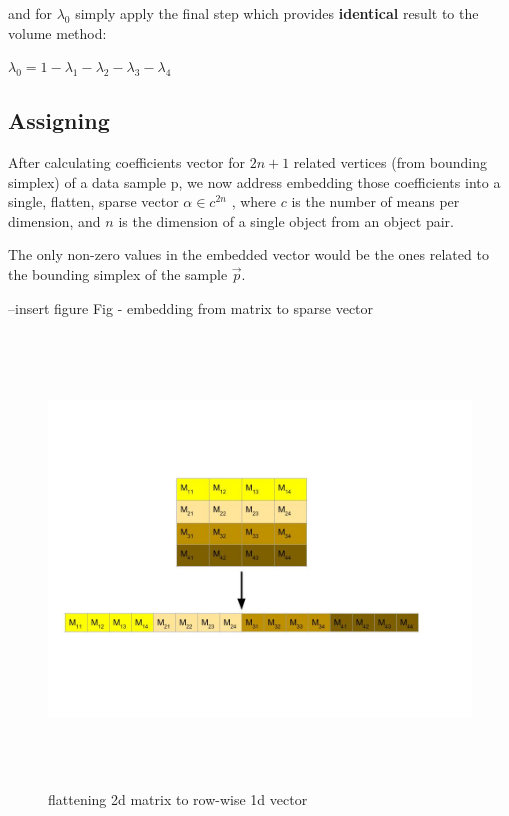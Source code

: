 \begin{}
		
		and for $\lambda_0$ simply apply the final step which provides \textbf{identical} result to the volume method:
		
		$\lambda_0 = 1 - \lambda_1 - \lambda_2 - \lambda_3 - \lambda_4$ \\
		
	\subsection{Assigning}
	
	After calculating coefficients vector for $2n+1$ related vertices (from bounding simplex) of a data sample p, we now address embedding those coefficients into a single, flatten, sparse vector $\alpha \in c^{2n}$ , where $c$ is the number of means per dimension, and $n$ is the dimension of a single object from an object pair.
	
	The only non-zero values in the embedded vector would be the ones related to the bounding simplex of the sample $\overrightarrow{p}$.
	
	
	
	
	--insert figure Fig - embedding from matrix to sparse vector
	
	
	\begin{figure}[h] \label{flatt}
	
		\includegraphics[width=\linewidth,height=12cm,keepaspectratio]{Figures/flatten}
		\caption[flattening 2d matrix]
		{flattening 2d matrix to row-wise 1d vector}
	

\end{figure}
\end{}
